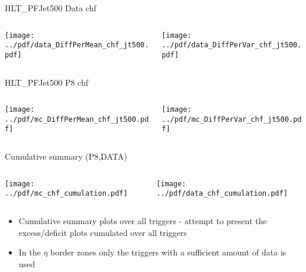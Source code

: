 \documentclass[9pt]{beamer}
\begin{document}
\begin{frame}[t]{HLT\_PFJet500 Data chf}
\begin{columns}[T]
  \begin{column}{.5\textwidth}
  \texttt{[image: ../pdf/data\_DiffPerMean\_chf\_jt500.pdf]}
  \end{column}
  \begin{column}{.5\textwidth}
  \texttt{[image: ../pdf/data\_DiffPerVar\_chf\_jt500.pdf]}
  \end{column}
\end{columns}
\end{frame}

\begin{frame}[t]{HLT\_PFJet500 P8 chf}
\begin{columns}[T]
  \begin{column}{.5\textwidth}
  \texttt{[image: ../pdf/mc\_DiffPerMean\_chf\_jt500.pdf]}
  \end{column}
  \begin{column}{.5\textwidth}
  \texttt{[image: ../pdf/mc\_DiffPerVar\_chf\_jt500.pdf]}
  \end{column}
\end{columns}
\end{frame}

\begin{frame}[t]{Cumulative summary (P8,DATA)}
\begin{columns}[T]
  \begin{column}{.5\textwidth}
  \texttt{[image: ../pdf/mc\_chf\_cumulation.pdf]}
  \end{column}
  \begin{column}{.5\textwidth}
  \texttt{[image: ../pdf/data\_chf\_cumulation.pdf]}
  \end{column}
\end{columns}
\begin{itemize}
 \item Cumulative summary plots over all triggers - attempt to present the excess/deficit plots cumulated over all triggers
 \item In the $\eta$ border zones only the triggers with a sufficient amount of data is used
\end{itemize}
\end{frame}
\end{document}
